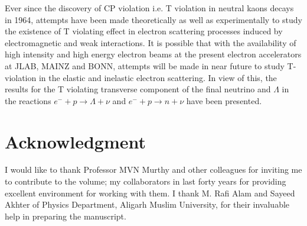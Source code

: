 Ever since the discovery of CP violation i.e. T violation in neutral kaons decays in 1964, attempts have been made theoretically as well as experimentally to study the existence of T violating effect  in electron scattering processes induced by electromagnetic and weak interactions. It is possible that with the availability of high intensity and high energy electron beams at the present electron accelerators at JLAB, MAINZ and BONN, attempts will be made in near future to study T-violation in the elastic and inelastic electron scattering. In view of this, the results for the T violating transverse component of the final neutrino and $\Lambda$ in the reactions $e^-+p\rightarrow \Lambda+\nu$ and $e^-+p\rightarrow n+\nu$ have been presented.

\section{Acknowledgment}

I would like to thank Professor MVN Murthy and other colleagues for inviting me to contribute to the volume; my collaborators in last forty years for providing excellent environment for working with them. I thank M. Rafi Alam and Sayeed Akhter of Physics Department, Aligarh Muslim University, for their invaluable help in preparing the manuscript. 

